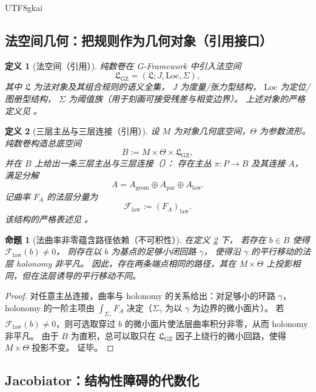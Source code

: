 \documentclass[12pt]{article}
\newtheorem{definition}{定义}[section]
\newtheorem{proposition}{命题}[section]
\begin{document}
\begin{CJK*}{UTF8}{gkai}
\subsection{法空间几何：把规则作为几何对象（引用接口）}

\begin{definition}[法空间（引用）]\label{def:B-lawspace}
纯数卷在 G-Framework 中引入法空间
\[
  \mathfrak{L}_{\mathrm{GZ}}=(\mathfrak{L};J,\mathrm{Loc},\Sigma),
\]
其中 $\mathfrak{L}$ 为法对象及其组合规则的语义全集，
$J$ 为度量/张力型结构，
$\mathrm{Loc}$ 为定位/图册型结构，
$\Sigma$ 为阈值族（用于刻画可接受残差与相变边界）。
上述对象的严格定义见 \cite{GaoZheng2025GFramework}。
\end{definition}

\begin{definition}[三层主丛与三层连接（引用）]\label{def:B-tlc}
设 $M$ 为对象几何底空间，$\Theta$ 为参数流形。
纯数卷构造总底空间
\[
  B := M\times \Theta \times \mathfrak{L}_{\mathrm{GZ}},
\]
并在 $B$ 上给出一条三层主丛与三层连接（\GZTLC）：
存在主丛 $\pi:P\to B$ 及其连接 $A$，满足分解
\[
  A = A_{\mathrm{geom}}\oplus A_{\mathrm{par}}\oplus A_{\mathrm{law}}.
\]
记曲率 $F_A$ 的法层分量为
\[
  \mathcal{F}_{\mathrm{law}} := (F_A)_{\mathrm{law}} .
\]
该结构的严格表述见 \cite{GaoZheng2025GFramework}。
\end{definition}

\begin{proposition}[法曲率非零蕴含路径依赖（不可积性）]\label{prop:B-law-curv-path}
在定义 \ref{def:B-tlc} 下，
若存在 $b\in B$ 使得 $\mathcal{F}_{\mathrm{law}}(b)\neq 0$，
则存在以 $b$ 为基点的足够小闭回路 $\gamma$，
使得沿 $\gamma$ 的平行移动的法层 holonomy 非平凡。
因此，存在两条端点相同的路径，其在 $M\times \Theta$ 上投影相同，但在法层诱导的平行移动不同。
\end{proposition}

\begin{proof}
对任意主丛连接，曲率与 holonomy 的关系给出：对足够小的环路 $\gamma$，
holonomy 的一阶主项由 $\int_{\Sigma_\gamma} F_A$ 决定（$\Sigma_\gamma$ 为以 $\gamma$ 为边界的微小面片）。
若 $\mathcal{F}_{\mathrm{law}}(b)\neq 0$，则可选取穿过 $b$ 的微小面片使法层曲率积分非零，从而 holonomy 非平凡。
由于 $B$ 为直积，总可以取只在 $\mathfrak{L}_{\mathrm{GZ}}$ 因子上绕行的微小回路，使得 $M\times\Theta$ 投影不变。
证毕。
\end{proof}

\subsection{Jacobiator：结构性障碍的代数化}


\end{CJK*}
\end{document}
